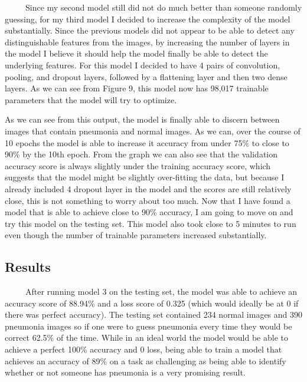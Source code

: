 \documentclass[12pt]{article}
\begin{document}
~~~~~Since my second model still did not do much better than someone
randomly guessing, for my third model I decided to increase the
complexity of the model substantially. Since the previous models did not
appear to be able to detect any distinguishable features from the
images, by increasing the number of layers in the model I believe it
should help the model finally be able to detect the underlying features.
For this model I decided to have 4 pairs of convolution, pooling, and
dropout layers, followed by a flattening layer and then two dense
layers. As we can see from Figure 9, this model now has 98,017 trainable
parameters that the model will try to optimize.

As we can see from this output, the model is finally able to discern
between images that contain pneumonia and normal images. As we can, over
the course of 10 epochs the model is able to increase it accuracy from
under 75\% to close to 90\% by the 10th epoch. From the graph we can
also see that the validation accuracy score is always slightly under the
training accuracy score, which suggests that the model might be slightly
over-fitting the data, but because I already included 4 dropout layer in
the model and the scores are still relatively close, this is not
something to worry about too much. Now that I have found a model that is
able to achieve close to 90\% accuracy, I am going to move on and try
this model on the testing set. This model also took close to 5 minutes
to run even though the number of trainable parameters increased
substantially.

\hypertarget{results}{%
\subsection{Results}\label{results}}

~~~~~After running model 3 on the testing set, the model was able to
achieve an accuracy score of 88.94\% and a loss score of 0.325 (which
would ideally be at 0 if there was perfect accuracy). The testing set
contained 234 normal images and 390 pneumonia images so if one were to
guess pneumonia every time they would be correct 62.5\% of the time.
While in an ideal world the model would be able to achieve a perfect
100\% accuracy and 0 loss, being able to train a model that achieves an
accuracy of 89\% on a task as challenging as being able to identify
whether or not someone has pneumonia is a very promising result.
\end{document}
